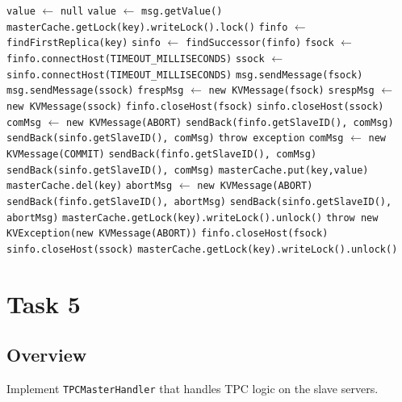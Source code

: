 \documentclass{article}
\begin{document}
\begin{bframe}
\begin{algorithmic}
			\State \texttt{value} $\leftarrow$ \texttt{null}
				\State \texttt{value} $\leftarrow$ \texttt{msg.getValue()}
    	\EndIf
			\State \texttt{masterCache.getLock(key).writeLock().lock()}
			\State \texttt{finfo} $\leftarrow$ \texttt{findFirstReplica(key)}
			\State \texttt{sinfo} $\leftarrow$ \texttt{findSuccessor(finfo)}
			\State \texttt{fsock} $\leftarrow$ \texttt{finfo.connectHost(TIMEOUT\_MILLISECONDS)}
			\State \texttt{ssock} $\leftarrow$ \texttt{sinfo.connectHost(TIMEOUT\_MILLISECONDS)}
    	\State \texttt{msg.sendMessage(fsock)}
			\State \texttt{msg.sendMessage(ssock)}
			\State \texttt{frespMsg} $\leftarrow$ \texttt{new KVMessage(fsock)}
			\State \texttt{srespMsg} $\leftarrow$ \texttt{new KVMessage(ssock)}
				\State \texttt{finfo.closeHost(fsock)}
				\State \texttt{sinfo.closeHost(ssock)}
				\State \texttt{comMsg} $\leftarrow$ \texttt{new KVMessage(ABORT)}
				\State \texttt{sendBack(finfo.getSlaveID(), comMsg)}
				\State \texttt{sendBack(sinfo.getSlaveID(), comMsg)}
				\State \texttt{throw exception}
			\EndIf
				\State \texttt{comMsg} $\leftarrow$ \texttt{new KVMessage(COMMIT)}
				\State \texttt{sendBack(finfo.getSlaveID(), comMsg)}
				\State \texttt{sendBack(sinfo.getSlaveID(), comMsg)}
					\State \texttt{masterCache.put(key,value)}
				\Else
					\State \texttt{masterCache.del(key)}
				\EndIf
			\Else
	    	\State \texttt{abortMsg} $\leftarrow$ \texttt{new KVMessage(ABORT)}
	    	\State \texttt{sendBack(finfo.getSlaveID(), abortMsg)}
    		\State \texttt{sendBack(sinfo.getSlaveID(), abortMsg)}
				\State \texttt{masterCache.getLock(key).writeLock().unlock()}
				\State \texttt{throw new KVException(new KVMessage(ABORT))}
    	\EndIf
			\State \texttt{finfo.closeHost(fsock)}
			\State \texttt{sinfo.closeHost(ssock)}
			\State \texttt{masterCache.getLock(key).writeLock().unlock()}
		\EndProcedure
	\end{algorithmic}
\end{bframe}

\section{Task 5}
\subsection{Overview}
Implement \texttt{TPCMasterHandler} that handles TPC logic on the slave servers.
\end{document}
